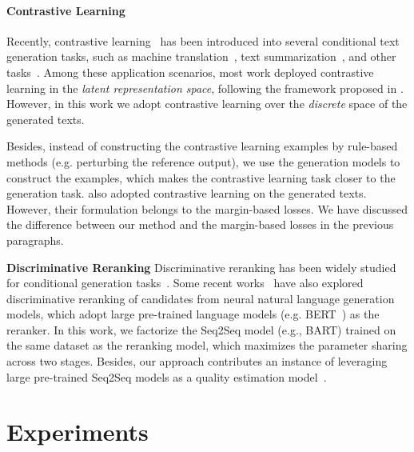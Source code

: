 \documentclass[11pt]{article}
\begin{document}
\paragraph{Contrastive Learning}

Recently, contrastive learning~\citep{10.1109/CVPR.2006.100} has been introduced into several conditional text generation tasks, such as machine translation~\citep{yang-etal-2019-reducing, pan-etal-2021-contrastive}, text summarization~\citep{cao-wang-2021-cliff, DBLP:journals/corr/abs-2109-03481, DBLP:journals/corr/abs-2108-11846}, and other tasks~\citep{uehara-etal-2020-learning,cho-etal-2021-contrastive, lee2021contrastive}. 
Among these application scenarios, most work deployed contrastive learning in the \textit{latent representation space}, following the framework proposed in \citet{pmlr-v119-chen20j}.
However, in this work we adopt contrastive learning over the \textit{discrete} space of the generated texts.

Besides, instead of constructing the contrastive learning examples by rule-based methods (e.g. perturbing the reference output), we use the generation models to construct the examples, which makes the contrastive learning task closer to the generation task.
\citet{DBLP:journals/corr/abs-2108-11846} also adopted contrastive learning on the generated texts. 
However, their formulation belongs to the margin-based losses.
We have discussed the difference between our method and the margin-based losses in the previous paragraphs.


\noindent \textbf{Discriminative Reranking}
Discriminative reranking has been widely studied for conditional generation tasks~\citep{shen-etal-2004-discriminative, och-etal-2004-smorgasbord,Wan2015MultiDocumentSV, mizumoto-matsumoto-2016-discriminative}.
Some recent works~\citep{liu-liu-2021-simcls, lee-etal-2021-discriminative} have also explored discriminative reranking of candidates from neural natural language generation models, which adopt large pre-trained language models (e.g. BERT~\citep{devlin-etal-2019-bert}) as the reranker.
In this work, we factorize the Seq2Seq model (e.g., BART) trained on the same dataset as the reranking model, which maximizes the parameter sharing across two stages.
Besides, our approach contributes an instance of leveraging large pre-trained Seq2Seq models as a quality estimation model~\citep{yuan2021bartscore}. 


\section{Experiments}
\end{document}
